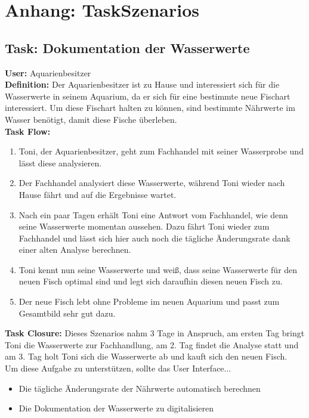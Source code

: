 \chapter{Anhang: TaskSzenarios}\label{app:taskscenarios}

\section{Task: Dokumentation der Wasserwerte}
\textbf{User:} Aquarienbesitzer\\

\textbf{Definition:} Der Aquarienbesitzer ist zu Hause und interessiert sich für die Wasserwerte in seinem Aquarium, da er sich für eine bestimmte neue Fischart interessiert. Um diese Fischart halten zu können, sind bestimmte Nährwerte im Wasser benötigt, damit diese Fische überleben.\\

\textbf{Task Flow:}
\begin{enumerate}
 	\item Toni, der Aquarienbesitzer, geht zum Fachhandel mit seiner Wasserprobe und lässt diese analysieren.
 	\item Der Fachhandel analysiert diese Wasserwerte, während Toni wieder nach Hause fährt und auf die Ergebnisse wartet.
 	\item Nach ein paar Tagen erhält Toni eine Antwort vom Fachhandel, wie denn seine Wasserwerte momentan aussehen. Dazu fährt Toni wieder zum Fachhandel und lässt sich  hier auch noch die tägliche Änderungsrate dank einer alten Analyse berechnen.
 	\item Toni kennt nun seine Wasserwerte und weiß, dass seine Wasserwerte für den neuen Fisch optimal sind und legt sich daraufhin diesen neuen Fisch zu.
	 \item Der neue Fisch lebt ohne Probleme im neuen Aquarium und passt zum Gesamtbild sehr gut dazu.
\end{enumerate}
\textbf{Task Closure:} Dieses Szenarios nahm 3 Tage in Anspruch, am ersten Tag bringt Toni die Wasserwerte zur Fachhandlung, am 2. Tag findet die Analyse statt und am 3. Tag holt Toni sich die Wasserwerte ab und kauft sich den neuen Fisch.\\

Um diese Aufgabe zu unterstützen, sollte das User Interface...
\begin{itemize}
  \item Die tägliche Änderungsrate der Nährwerte automatisch berechnen
  \item Die Dokumentation der Wasserwerte zu digitalisieren
\end{itemize}	


